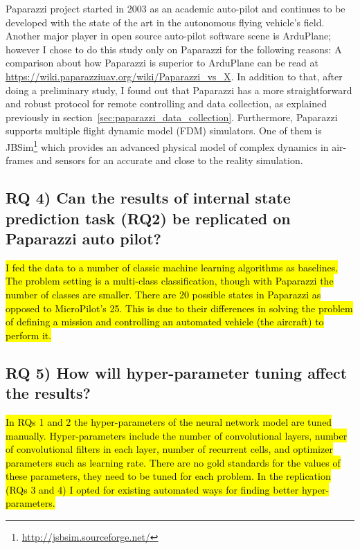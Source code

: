 Paparazzi \cite{hattenberger2014using} project started in 2003 as an academic auto-pilot and continues to be developed with the state of the art in the autonomous flying vehicle's field. Another major player in open source auto-pilot software scene is ArduPlane; however I chose to do this study only on Paparazzi for the following reasons:
A comparison about how Paparazzi is superior to ArduPlane can be read at \url{https://wiki.paparazziuav.org/wiki/Paparazzi_vs_X}. 
In addition to that, after doing a preliminary study, I found out that Paparazzi has a more straightforward and robust protocol for remote controlling and data collection, as explained previously in section~\ref{sec:paparazzi_data_collection}. 
Furthermore, Paparazzi supports multiple flight dynamic model (FDM) simulators. One of them is JBSim\footnote{\url{http://jsbsim.sourceforge.net/}} which provides an advanced physical model of complex dynamics in air-frames and sensors for an accurate and close to the reality simulation. 



\subsection{RQ 4) Can the results of internal state prediction task (RQ2) be replicated on Paparazzi auto pilot?}
\hl{I fed the data to a number of classic machine learning algorithms as baselines. The problem setting is a multi-class classification, though with Paparazzi the number of classes are smaller. 
There are 20 possible states in Paparazzi as opposed to MicroPilot's 25. This is due to their differences in solving the problem of defining a mission and controlling an automated vehicle (the aircraft) to perform it.}

\subsection{RQ 5) How will hyper-parameter tuning affect the results?}
\hl{In RQs 1 and 2 the hyper-parameters of the neural network model are tuned manually. Hyper-parameters include the number of convolutional layers, number of convolutional filters in each layer, number of recurrent cells, and optimizer parameters such as learning rate. There are no gold standards for the values of these parameters, they need to be tuned for each problem. In the replication (RQs 3 and 4) I opted for existing automated ways for finding better hyper-parameters.}

